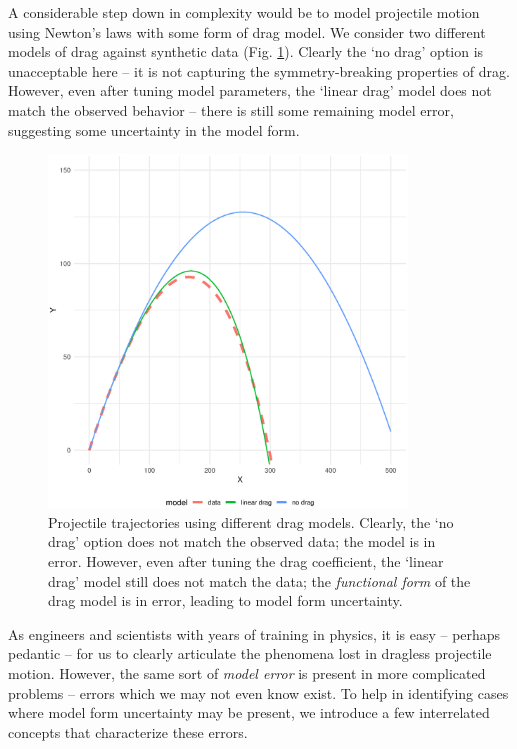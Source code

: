 \documentclass[../primer.tex]{subfiles}
\begin{document}
A considerable step down in complexity would be to model projectile motion using
Newton's laws with some form of drag model. We consider two different models of
drag against synthetic data (Fig. \ref{fig:projectile-traj}). Clearly the `no
drag' option is unacceptable here -- it is not capturing the symmetry-breaking
properties of drag. However, even after tuning model parameters, the `linear
drag' model does not match the observed behavior -- there is still some
remaining model error, suggesting some uncertainty in the model form.

\begin{figure}[!ht]
  \centering
  \includegraphics[width=0.85\textwidth]{./images/projectile_traj}

  \caption{Projectile trajectories using different drag models. Clearly, the `no
    drag' option does not match the observed data; the model is in error.
    However, even after tuning the drag coefficient, the `linear drag' model
    still does not match the data; the \emph{functional form} of the drag model
    is in error, leading to model form uncertainty.}
  \label{fig:projectile-traj}
\end{figure}

As engineers and scientists with years of training in physics, it is easy --
perhaps pedantic -- for us to clearly articulate the phenomena lost in dragless
projectile motion. However, the same sort of \emph{model error} is present in
more complicated problems -- errors which we may not even know exist. To help in
identifying cases where model form uncertainty may be present, we introduce a
few interrelated concepts that characterize these errors.
\end{document}

